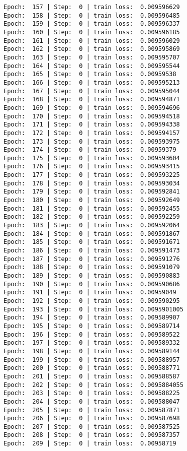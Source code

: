 \documentclass[11pt]{article}
\begin{document}
\begin{Verbatim}[commandchars=\\\{\}]
Epoch:  157 | Step:  0 | train loss:  0.009596629
Epoch:  158 | Step:  0 | train loss:  0.009596485
Epoch:  159 | Step:  0 | train loss:  0.009596337
Epoch:  160 | Step:  0 | train loss:  0.009596185
Epoch:  161 | Step:  0 | train loss:  0.009596029
Epoch:  162 | Step:  0 | train loss:  0.009595869
Epoch:  163 | Step:  0 | train loss:  0.009595707
Epoch:  164 | Step:  0 | train loss:  0.009595544
Epoch:  165 | Step:  0 | train loss:  0.00959538
Epoch:  166 | Step:  0 | train loss:  0.009595213
Epoch:  167 | Step:  0 | train loss:  0.009595044
Epoch:  168 | Step:  0 | train loss:  0.009594871
Epoch:  169 | Step:  0 | train loss:  0.009594696
Epoch:  170 | Step:  0 | train loss:  0.009594518
Epoch:  171 | Step:  0 | train loss:  0.009594338
Epoch:  172 | Step:  0 | train loss:  0.009594157
Epoch:  173 | Step:  0 | train loss:  0.009593975
Epoch:  174 | Step:  0 | train loss:  0.00959379
Epoch:  175 | Step:  0 | train loss:  0.009593604
Epoch:  176 | Step:  0 | train loss:  0.009593415
Epoch:  177 | Step:  0 | train loss:  0.009593225
Epoch:  178 | Step:  0 | train loss:  0.009593034
Epoch:  179 | Step:  0 | train loss:  0.009592841
Epoch:  180 | Step:  0 | train loss:  0.009592649
Epoch:  181 | Step:  0 | train loss:  0.009592455
Epoch:  182 | Step:  0 | train loss:  0.009592259
Epoch:  183 | Step:  0 | train loss:  0.009592064
Epoch:  184 | Step:  0 | train loss:  0.009591867
Epoch:  185 | Step:  0 | train loss:  0.009591671
Epoch:  186 | Step:  0 | train loss:  0.009591473
Epoch:  187 | Step:  0 | train loss:  0.009591276
Epoch:  188 | Step:  0 | train loss:  0.009591079
Epoch:  189 | Step:  0 | train loss:  0.009590883
Epoch:  190 | Step:  0 | train loss:  0.009590686
Epoch:  191 | Step:  0 | train loss:  0.00959049
Epoch:  192 | Step:  0 | train loss:  0.009590295
Epoch:  193 | Step:  0 | train loss:  0.0095901005
Epoch:  194 | Step:  0 | train loss:  0.009589907
Epoch:  195 | Step:  0 | train loss:  0.009589714
Epoch:  196 | Step:  0 | train loss:  0.009589522
Epoch:  197 | Step:  0 | train loss:  0.009589332
Epoch:  198 | Step:  0 | train loss:  0.009589144
Epoch:  199 | Step:  0 | train loss:  0.009588957
Epoch:  200 | Step:  0 | train loss:  0.009588771
Epoch:  201 | Step:  0 | train loss:  0.009588587
Epoch:  202 | Step:  0 | train loss:  0.0095884055
Epoch:  203 | Step:  0 | train loss:  0.009588225
Epoch:  204 | Step:  0 | train loss:  0.009588047
Epoch:  205 | Step:  0 | train loss:  0.009587871
Epoch:  206 | Step:  0 | train loss:  0.009587698
Epoch:  207 | Step:  0 | train loss:  0.009587525
Epoch:  208 | Step:  0 | train loss:  0.009587357
Epoch:  209 | Step:  0 | train loss:  0.00958719

\end{Verbatim}
\end{document}
